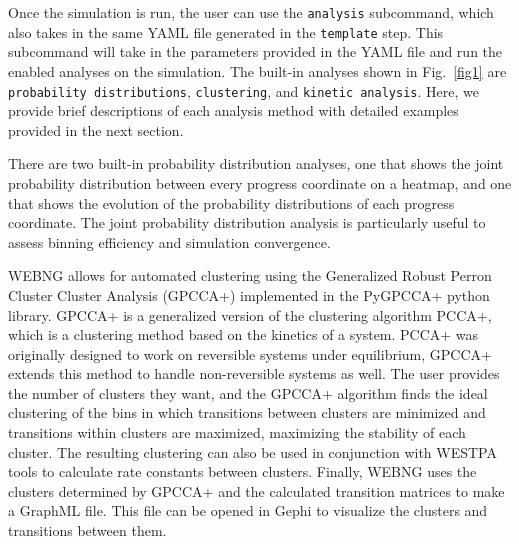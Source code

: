 \documentclass[10pt,letterpaper]{article}
\begin{document}
Once the simulation is run, the user can use the \texttt{analysis} subcommand, which also takes in the same YAML file generated in the \texttt{template} step. This subcommand will take in the parameters provided in the YAML file and run the enabled analyses on the simulation. The built-in analyses shown in Fig.~\ref{fig1} are \texttt{probability distributions}, \texttt{clustering}, and \texttt{kinetic analysis}. Here, we provide brief descriptions of each analysis method with detailed examples provided in the next section. 

There are two built-in probability distribution analyses, one that shows the joint probability distribution between every progress coordinate on a heatmap, and one that shows the evolution of the probability distributions of each progress coordinate. The joint probability distribution analysis is particularly useful to assess binning efficiency and simulation convergence. 

WEBNG allows for automated clustering using the Generalized Robust Perron Cluster Cluster Analysis (GPCCA+)\cite{pygpcca1} implemented in the PyGPCCA+ python library\cite{pygpcca2}. GPCCA+ is a generalized version of the clustering algorithm PCCA+\cite{PCCAp1,PCCAp2}, which is a clustering method based on the kinetics of a system. PCCA+ was originally designed to work on reversible systems under equilibrium, GPCCA+ extends this method to handle non-reversible systems as well. The user provides the number of clusters they want, and the GPCCA+ algorithm finds the ideal clustering of the bins in which transitions between clusters are minimized and transitions within clusters are maximized, maximizing the stability of each cluster. The resulting clustering can also be used in conjunction with WESTPA tools to calculate rate constants between clusters. Finally, WEBNG uses the clusters determined by GPCCA+ and the calculated transition matrices to make a GraphML file\cite{graphml}. This file can be opened in Gephi\cite{gephi} to visualize the clusters and transitions between them.

\end{document}
